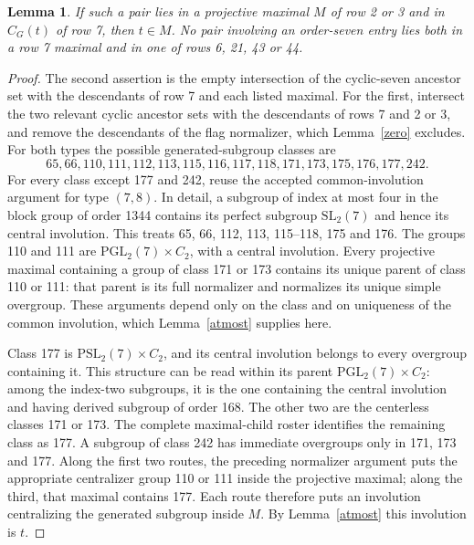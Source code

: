 \documentclass[11pt,a4paper]{article}
\newtheorem{lemma}{Lemma}\newtheorem{theorem}{Theorem}
\begin{document}
\begin{lemma}\label{inside}
If such a pair lies in a projective maximal $M$ of row 2 or 3 and
in $C_G(t)$ of row 7, then $t\in M$. No pair involving an order-seven
entry lies both in a row 7 maximal and in one of rows 6, 21, 43 or 44.
\end{lemma}
\begin{proof}
The second assertion is the empty intersection of the cyclic-seven
ancestor set with the descendants of row 7 and each listed maximal.
For the first, intersect the two relevant cyclic ancestor sets with
the descendants of rows 7 and 2 or 3, and remove the descendants of
the flag normalizer, which Lemma~\ref{zero} excludes. For both types
the possible generated-subgroup classes are
\[
65,66,110,111,112,113,115,116,117,118,171,173,175,176,177,242.
\]
For every class except 177 and 242, reuse the accepted common-involution
argument for type $(7,8)$. In detail, a subgroup of index at most four
in the block group of order 1344 contains its perfect subgroup
$\mathrm{SL}_2(7)$ and hence its central involution. This treats
65, 66, 112, 113, 115--118, 175 and 176. The groups 110 and 111 are
$\mathrm{PGL}_2(7)\times C_2$, with a central involution. Every
projective maximal containing a group of class 171 or 173 contains
its unique parent of class 110 or 111: that parent is its full
normalizer and normalizes its unique simple overgroup. These
arguments depend only on the class and on uniqueness of the common
involution, which Lemma~\ref{atmost} supplies here.

Class 177 is $\mathrm{PSL}_2(7)\times C_2$, and its central involution
belongs to every overgroup containing it. This structure can be
read within its parent $\mathrm{PGL}_2(7)\times C_2$: among the
index-two subgroups, it is the one containing the central involution
and having derived subgroup of order 168. The other two are the
centerless classes 171 or 173. The complete maximal-child roster
identifies the remaining class as 177.
A subgroup of class 242 has immediate overgroups only in 171, 173
and 177. Along the first two routes, the preceding normalizer
argument puts the appropriate centralizer group 110 or 111 inside
the projective maximal; along the third, that maximal contains 177.
Each route therefore puts an involution centralizing the generated
subgroup inside $M$. By Lemma~\ref{atmost} this involution is $t$.
\end{proof}
\end{document}
